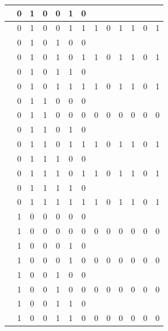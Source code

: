 \begin{table}[!tb]
\begin{tabular}{|c|c|c|c|c|c|c|c|c|c|c|c|c|}
        \rowcolor{yellow!40}  & 0 & 1 & 0 & 0 & 1 & 0 &  &  &  &  &  &  \\ \hline
        \rowcolor{yellow!40}  & 0 & 1 & 0 & 0 & 1 & 1 & 1 & 0 & 1 & 1 & 0 & 1 \\ \hline
        \rowcolor{gray!40}  & 0 & 1 & 0 & 1 & 0 & 0 &  &  &  &  &  &  \\ \hline
        \rowcolor{gray!40}  & 0 & 1 & 0 & 1 & 0 & 1 & 1 & 0 & 1 & 1 & 0 & 1 \\ \hline
        \rowcolor{blue!40}  & 0 & 1 & 0 & 1 & 1 & 0 &  &  &  &  &  &  \\ \hline
        \rowcolor{blue!40}  & 0 & 1 & 0 & 1 & 1 & 1 & 1 & 0 & 1 & 1 & 0 & 1 \\ \hline
        \rowcolor{red!40}  & 0 & 1 & 1 & 0 & 0 & 0 &  &  &  &  &  &  \\ \hline
        \rowcolor{red!40}  & 0 & 1 & 1 & 0 & 0 & 0 & 0 & 0 & 0 & 0 & 0 & 0 \\ \hline
        \rowcolor{green!40}  & 0 & 1 & 1 & 0 & 1 & 0 &  &  &  &  &  &  \\ \hline
        \rowcolor{green!40}  & 0 & 1 & 1 & 0 & 1 & 1 & 1 & 0 & 1 & 1 & 0 & 1 \\ \hline
        \rowcolor{yellow!40}  & 0 & 1 & 1 & 1 & 0 & 0 &  &  &  &  &  &  \\ \hline
        \rowcolor{yellow!40}  & 0 & 1 & 1 & 1 & 0 & 1 & 1 & 0 & 1 & 1 & 0 & 1 \\ \hline
        \rowcolor{gray!40}  & 0 & 1 & 1 & 1 & 1 & 0 &  &  &  &  &  &  \\ \hline
        \rowcolor{gray!40}  & 0 & 1 & 1 & 1 & 1 & 1 & 1 & 0 & 1 & 1 & 0 & 1 \\ \hline
        \rowcolor{blue!40}  & 1 & 0 & 0 & 0 & 0 & 0 &  &  &  &  &  &  \\ \hline
        \rowcolor{blue!40}  & 1 & 0 & 0 & 0 & 0 & 0 & 0 & 0 & 0 & 0 & 0 & 0 \\ \hline
        \rowcolor{red!40}  & 1 & 0 & 0 & 0 & 1 & 0 &  &  &  &  &  &  \\ \hline
        \rowcolor{red!40}  & 1 & 0 & 0 & 0 & 1 & 0 & 0 & 0 & 0 & 0 & 0 & 0 \\ \hline
        \rowcolor{green!40}  & 1 & 0 & 0 & 1 & 0 & 0 &  &  &  &  &  &  \\ \hline
        \rowcolor{green!40}  & 1 & 0 & 0 & 1 & 0 & 0 & 0 & 0 & 0 & 0 & 0 & 0 \\ \hline
        \rowcolor{yellow!40}  & 1 & 0 & 0 & 1 & 1 & 0 &  &  &  &  &  &  \\ \hline
        \rowcolor{yellow!40}  & 1 & 0 & 0 & 1 & 1 & 0 & 0 & 0 & 0 & 0 & 0 & 0 \\ \hline

\end{tabular}
\end{table}
